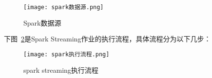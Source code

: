 \begin{figure}
    \centering
    \texttt{[image: spark数据源.png]}
    \caption{Spark数据源}
    \label{fig:spark}
  \end{figure}

  下图~\ref{fig:spark streaming}是Spark Streaming作业的执行流程，具体流程分为以下几步：
  \begin{figure}
    \centering
    \texttt{[image: spark执行流程.png]}
    \caption{spark streaming执行流程}
    \label{fig:spark streaming}
  \end{figure}
 


